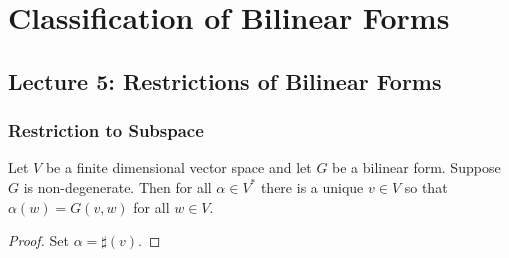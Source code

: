 \section{Classification of Bilinear Forms}

\subsection{Lecture 5: Restrictions of Bilinear Forms}
\subsubsection{Restriction to Subspace}
\begin{thm} Let $V$ be a finite dimensional vector space and let $G$ be a bilinear form. Suppose $G$ is non-degenerate. Then for all $\alpha \in V^*$ there is a unique $v \in V$ so that $\alpha(w) = G(v,w)$ for all $w \in V$. 
\end{thm}
\begin{proof}
    Set $\alpha = \sharp(v)$.
\end{proof}

